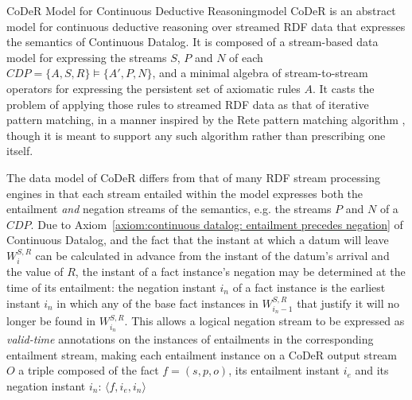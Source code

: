 \begin{nestedsection}{CoDeR Model for Continuous Deductive Reasoning}{model}
	CoDeR is an abstract model for continuous deductive reasoning over streamed RDF data that expresses the semantics of Continuous Datalog.
	It is composed of a stream-based data model for expressing the streams $S$, $P$ and $N$ of each ${CDP = \{A,S,R\} \vDash \{A',P,N\}}$, and a minimal algebra of stream-to-stream operators for expressing the persistent set of axiomatic rules $A$.
	It casts the problem of applying those rules to streamed RDF data as that of iterative pattern matching, in a manner inspired by the Rete pattern matching algorithm \citep{forgy79}, though it is meant to support any such algorithm rather than prescribing one itself.

	The data model of CoDeR differs from that of many RDF stream processing engines \citep{CQELS,EP-SPARQL} in that each stream entailed within the model expresses both the entailment \emph{and} negation streams of the semantics, e.g. the streams $P$ and $N$ of a ${CDP}$.
	Due to Axiom~\ref{axiom:continuous datalog: entailment precedes negation} of Continuous Datalog, and the fact that the instant at which a datum will leave $W^{S,R}_{i}$ can be calculated in advance from the instant of the datum's arrival and the value of $R$, the instant of a fact instance's negation may be determined at the time of its entailment:
	the negation instant $i_{n}$ of a fact instance is the earliest instant $i_{n}$ in which any of the base fact instances in $W^{S,R}_{i_n - 1}$ that justify it will no longer be found in $W^{S,R}_{i_n}$.
	This allows a logical negation stream to be expressed as \emph{valid-time} annotations \citep{SemanticStreamingManagement,sparkwave} on the instances of entailments in the corresponding entailment stream, making each entailment instance on a CoDeR output stream $O$ a triple composed of the fact ${f = (s,p,o)}$, its entailment instant $i_{e}$ and its negation instant $i_{n}$: ${\langle f,i_{e},i_{n} \rangle}$


\end{nestedsection}

